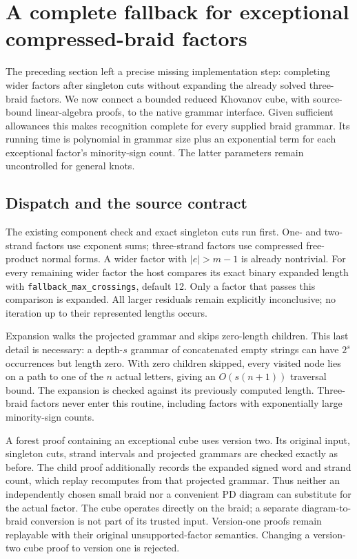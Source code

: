 \section{A complete fallback for exceptional compressed-braid factors}
\label{sec:exceptional-cube}

The preceding section left a precise missing implementation step: completing
wider factors after singleton cuts without expanding the already solved
three-braid factors. We now connect a bounded reduced Khovanov cube, with
source-bound linear-algebra proofs, to the native grammar interface. Given
sufficient allowances this makes recognition complete for every supplied braid
grammar. Its running time is polynomial in grammar size plus an exponential
term for each exceptional factor's minority-sign count. The latter parameters
remain uncontrolled for general knots.

\subsection{Dispatch and the source contract}

The existing component check and exact singleton cuts run first. One- and
two-strand factors use exponent sums; three-strand factors use compressed
free-product normal forms. A wider factor with $|e|>m-1$ is already nontrivial.
For every remaining wider factor the host compares its exact binary expanded
length with \texttt{fallback\_max\_crossings}, default 12. Only a factor that
passes this comparison is expanded. All larger residuals remain explicitly
inconclusive; no iteration up to their represented lengths occurs.

Expansion walks the projected grammar and skips zero-length children. This
last detail is necessary: a depth-$s$ grammar of concatenated empty strings
can have $2^s$ occurrences but length zero. With zero children skipped, every
visited node lies on a path to one of the $n$ actual letters, giving an
$O(s(n+1))$ traversal bound. The expansion is checked against its previously
computed length. Three-braid factors never enter this routine, including
factors with exponentially large minority-sign counts.

A forest proof containing an exceptional cube uses version two. Its original
input, singleton cuts, strand intervals and projected grammars are checked
exactly as before. The child proof additionally records the expanded signed
word and strand count, which replay recomputes from that projected grammar.
Thus neither an independently chosen small braid nor a convenient PD diagram
can substitute for the actual factor. The cube operates directly on the braid;
a separate diagram-to-braid conversion is not part of its trusted input.
Version-one proofs remain replayable with their original unsupported-factor
semantics. Changing a version-two cube proof to version one is rejected.

